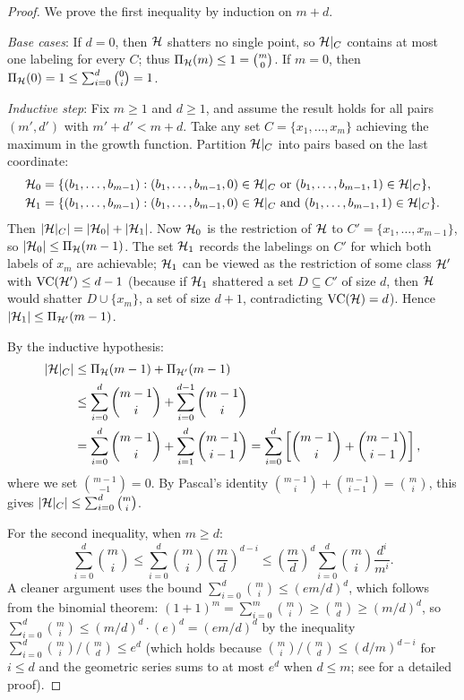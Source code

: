 \documentclass[11pt,a4paper]{article}
\begin{document}
\begin{proof}
We prove the first inequality by induction on $m + d$.

\emph{Base cases}: If $d = 0$, then $\mathcal{H}$ shatters no single
point, so $\mathcal{H}|_C$ contains at most one labeling for every $C$;
thus $\Pi_{\mathcal{H}}(m) \leq 1 = \binom{m}{0}$.  If $m = 0$, then
$\Pi_{\mathcal{H}}(0) = 1 \leq \sum_{i=0}^d \binom{0}{i} = 1$.

\emph{Inductive step}: Fix $m \geq 1$ and $d \geq 1$, and assume
the result holds for all pairs $(m', d')$ with $m' + d' < m + d$.
Take any set $C = \{x_1, \ldots, x_m\}$ achieving the maximum in
the growth function.  Partition $\mathcal{H}|_C$ into pairs based on
the last coordinate:
\begin{align*}
    \mathcal{H}_0 &= \{(b_1, \ldots, b_{m-1}) :
    (b_1, \ldots, b_{m-1}, 0) \in \mathcal{H}|_C
    \text{ or } (b_1, \ldots, b_{m-1}, 1) \in \mathcal{H}|_C\}, \\
    \mathcal{H}_1 &= \{(b_1, \ldots, b_{m-1}) :
    (b_1, \ldots, b_{m-1}, 0) \in \mathcal{H}|_C
    \text{ and } (b_1, \ldots, b_{m-1}, 1) \in \mathcal{H}|_C\}.
\end{align*}
Then $|\mathcal{H}|_C| = |\mathcal{H}_0| + |\mathcal{H}_1|$.  Now $\mathcal{H}_0$
is the restriction of $\mathcal{H}$ to $C' = \{x_1, \ldots, x_{m-1}\}$,
so $|\mathcal{H}_0| \leq \Pi_{\mathcal{H}}(m - 1)$.  The set $\mathcal{H}_1$
records the labelings on $C'$ for which both labels of $x_m$ are
achievable; $\mathcal{H}_1$ can be viewed as the restriction of some
class $\mathcal{H}'$ with $\operatorname{VC}(\mathcal{H}') \leq d - 1$ (because if
$\mathcal{H}_1$ shattered a set $D \subseteq C'$ of size $d$, then
$\mathcal{H}$ would shatter $D \cup \{x_m\}$, a set of size $d + 1$,
contradicting $\operatorname{VC}(\mathcal{H}) = d$).  Hence
$|\mathcal{H}_1| \leq \Pi_{\mathcal{H}'}(m - 1)$.

By the inductive hypothesis:
\begin{align*}
    |\mathcal{H}|_C| &\leq \Pi_{\mathcal{H}}(m-1) + \Pi_{\mathcal{H}'}(m-1) \\
    &\leq \sum_{i=0}^d \binom{m-1}{i} +
    \sum_{i=0}^{d-1} \binom{m-1}{i} \\
    &= \sum_{i=0}^d \binom{m-1}{i} + \sum_{i=1}^d \binom{m-1}{i-1}
    = \sum_{i=0}^d \left[\binom{m-1}{i} + \binom{m-1}{i-1}\right],
\end{align*}
where we set $\binom{m-1}{-1} = 0$.  By Pascal's identity
$\binom{m-1}{i} + \binom{m-1}{i-1} = \binom{m}{i}$, this gives
$|\mathcal{H}|_C| \leq \sum_{i=0}^d \binom{m}{i}$.

For the second inequality, when $m \geq d$:
\[
    \sum_{i=0}^d \binom{m}{i}
    \leq \sum_{i=0}^d \binom{m}{i} \left(\frac{m}{d}\right)^{d-i}
    \leq \left(\frac{m}{d}\right)^d \sum_{i=0}^d \binom{m}{i}
    \frac{d^i}{m^i}.
\]
A cleaner argument uses the bound
$\sum_{i=0}^d \binom{m}{i} \leq (em/d)^d$, which follows from the
binomial theorem: $(1 + 1)^m = \sum_{i=0}^m \binom{m}{i} \geq
\binom{m}{d} \geq (m/d)^d$, so
$\sum_{i=0}^d \binom{m}{i} \leq (m/d)^d \cdot (e)^d = (em/d)^d$
by the inequality $\sum_{i=0}^d \binom{m}{i} / \binom{m}{d}
\leq e^d$ (which holds because
$\binom{m}{i}/\binom{m}{d} \leq (d/m)^{d-i}$ for $i \leq d$
and the geometric series sums to at most $e^d$
when $d \leq m$; see \citet[Lemma~12.3]{devroye1996} for a
detailed proof).
\end{proof}
\end{document}
